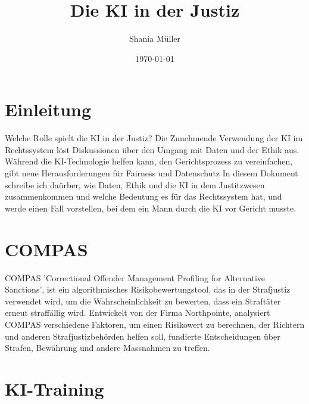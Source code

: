 \documentclass{article}
\title{Die KI in der Justiz}
\author{Shania Müller}
\date{\today}
\begin{document}
\maketitle


\tableofcontents


\newpage
\section {Einleitung}

Welche Rolle spielt die KI in der Justiz?  
Die Zunehmende Verwendung der KI im Rechtssystem löst Diskussionen über den 
Umgang mit Daten und der Ethik aus. Während die KI-Technologie helfen kann, den
Gerichtsprozess zu vereinfachen, gibt neue Herausforderungen für Fairness und Datenschutz
In diesem Dokument schreibe ich daürber, wie Daten, Ethik und die KI in dem Justitzwesen
zusammenkommen und welche Bedeutung es für das Rechtssystem hat, und werde einen Fall vorstellen, 
bei dem ein Mann durch die KI vor Gericht musste. 

\section {COMPAS}

COMPAS 'Correctional Offender Management Profiling for Alternative Sanctions', ist ein 
algorithmisches Risikobewertungstool, das in der Strafjustiz verwendet wird, um die 
Wahrscheinlichkeit zu bewerten, dass ein Straftäter erneut straffällig wird.
Entwickelt von der Firma Northpointe, analysiert COMPAS verschiedene Faktoren, um 
einen Risikowert zu berechnen, der Richtern und anderen 
Strafjustizbehörden helfen soll, fundierte Entscheidungen über Strafen, Bewährung und andere 
Massnahmen zu treffen.

\section {KI-Training}
\end{document}
